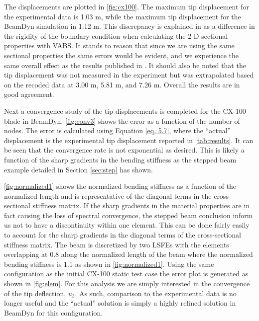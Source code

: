\documentclass[letterpaper,12pt]{article}
\begin{document}
The displacements are plotted in \ref{fig:cx100}. The maximum tip displacement for the experimental data is 1.03 m, while the maximum tip displacement for the BeamDyn simulation in 1.12 m. This discrepancy is explained in \cite{Luscher:2013} as a difference in the rigidity of the boundary condition when calculating the 2-D sectional properties with VABS. It stands to reason that since we are using the same sectional properties the same errors would be evident, and we experience the same overall effect as the results published in \cite{Luscher:2013}. It should also be noted that the tip displacement was not measured in the experiment but was extrapolated based on the recoded data at 3.00 m, 5.81 m, and 7.26 m. Overall the results are in good agreement.





Next a convergence study of the tip displacements is completed for the CX-100 blade in BeamDyn. \ref{fig:conv3} shows the error as a function of the number of nodes. The error is calculated using Equation \ref{eq. 5.7}, where the ``actual'' displacement is the experimental tip displacement reported in \ref{tab:results}. It can be seen that the convergence rate is not exponential as desired. This is likely a function of the sharp gradients in the bending stiffness as the stepped beam example detailed in Section \ref{sec:step} has shown.  


\ref{fig:normalized1} shows the normalized bending stiffness as a function of the normalized length and is representative of the diagonal terms in the cross-sectional stiffness matrix. If the sharp gradients in the material properties are in fact causing the loss of spectral convergence, the stepped beam conclusion inform us not to have a discontinuity within one element. This can be done fairly easily to account for the sharp gradients in the diagonal terms of the cross-sectional stiffness matrix. The beam is discretized by two LSFEs with the elements overlapping at 0.8 along the normalized length of the beam where the normalized bending stiffness is 1.1 as shown in \ref{fig:normalized1}. Using the same configuration as the initial CX-100 static test case the error plot is generated as shown in \ref{fig:elem}. For this analysis we are simply interested in the convergence of the tip deflection, $u_3$. As such, comparison to the experimental data is no longer useful and the ``actual'' solution is simply a highly refined solution in BeamDyn for this configuration. 
\end{document}
